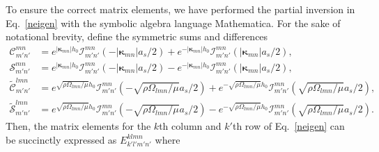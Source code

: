 \documentclass[aps,pre,amsmath,amssymb,floatfix,onecolumn,notitlepage,10pt]{revtex4-1}
\begin{document}
To ensure the correct matrix elements, we have performed the partial inversion in Eq.~\eqref{neigen} with the symbolic algebra language Mathematica.  For the sake of notational brevity, define the symmetric sums and differences
\begin{align*}
\mathcal{C}^{mn}_{m'n'} &= e^{|\bm{\kappa}_{mn}|h_0}\mathcal{I}_{m'n'}^{mn} \left(-|\bm{\kappa}_{mn}|a_s/2\right)+e^{-|\bm{\kappa}_{mn}|h_0}\mathcal{I}_{m'n'}^{mn} \left(|\bm{\kappa}_{mn}|a_s/2\right), \\
\mathcal{S}^{mn}_{m'n'} &= e^{|\bm{\kappa}_{mn}|h_0}\mathcal{I}_{m'n'}^{mn} \left(-|\bm{\kappa}_{mn}|a_s/2\right)-e^{-|\bm{\kappa}_{mn}|h_0}\mathcal{I}_{m'n'}^{mn} \left(|\bm{\kappa}_{mn}|a_s/2\right), \\
\tilde{\mathcal{C}}^{lmn}_{m'n'} &= e^{\sqrt{\rho\Omega_{lmn}/\mu}h_0}\mathcal{I}_{m'n'}^{mn} \left(-\sqrt{\rho\Omega_{lmn}/\mu}a_s/2\right)+e^{-\sqrt{\rho\Omega_{lmn}/\mu}h_0}\mathcal{I}_{m'n'}^{mn} \left(\sqrt{\rho\Omega_{lmn}/\mu}a_s/2\right), \\
\tilde{\mathcal{S}}^{lmn}_{m'n'} &= e^{\sqrt{\rho\Omega_{lmn}/\mu}h_0}\mathcal{I}_{m'n'}^{mn} \left(-\sqrt{\rho\Omega_{lmn}/\mu}a_s/2\right)-e^{-\sqrt{\rho\Omega_{lmn}/\mu}h_0}\mathcal{I}_{m'n'}^{mn} \left(\sqrt{\rho\Omega_{lmn}/\mu}a_s/2\right).
\end{align*}
Then, the matrix elements for the $k$th column and $k'$th row of Eq.~\eqref{neigen} can be succinctly expressed as $E_{k'l'm'n'}^{klmn}$ where
\end{document}
